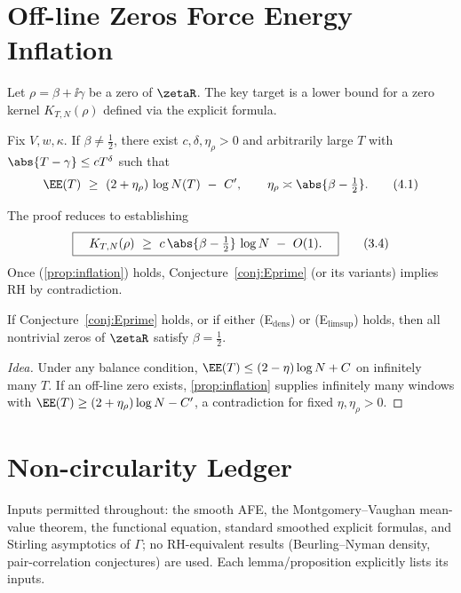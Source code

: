\section{Off-line Zeros Force Energy Inflation}
Let $\rho=\beta+\ii\gamma$ be a zero of $\zetaR$. The key target is a lower bound for a zero kernel $K_{T,N}(\rho)$ defined via the explicit formula.

\begin{proposition}\label{prop:inflation}
Fix $V,w,\kappa$. If $\beta\neq\tfrac12$, there exist $c,\delta,\eta_\rho>0$ and arbitrarily large $T$ with $\abs{T-\gamma}\le c T^\delta$ such that
\begin{equation}
\EE(T)\ \ge\ (2+\eta_\rho)\,\log N(T)\ -\ C',\qquad \eta_\rho\asymp \abs{\beta-\tfrac12}.
\tag{4.1}
\end{equation}
\end{proposition}
The proof reduces to establishing
\begin{equation}
\boxed{\quad K_{T,N}(\rho)\ \ge\ c\,\abs{\beta-\tfrac12}\,\log N\ -\ O(1).\quad}
\tag{3.4}
\end{equation}
Once (\ref{prop:inflation}) holds, Conjecture~\ref{conj:Eprime} (or its variants) implies RH by contradiction.

\begin{theorem}\label{thm:EtoRH}
If Conjecture~\ref{conj:Eprime} holds, or if either (E$_\mathrm{dens}$) or (E$_\mathrm{limsup}$) holds, then all nontrivial zeros of $\zetaR$ satisfy $\beta=\tfrac12$.
\end{theorem}
\begin{proof}[Idea]
Under any balance condition, $\EE(T)\le (2-\eta)\log N +C$ on infinitely many $T$. If an off-line zero exists, \cref{prop:inflation} supplies infinitely many windows with $\EE(T)\ge (2+\eta_\rho)\log N -C'$, a contradiction for fixed $\eta,\eta_\rho>0$.
\end{proof}

\section{Non-circularity Ledger}
Inputs permitted throughout: the smooth AFE, the Montgomery--Vaughan mean-value theorem, the functional equation, standard smoothed explicit formulas, and Stirling asymptotics of $\Gamma$; no RH-equivalent results (Beurling--Nyman density, pair-correlation conjectures) are used. Each lemma/proposition explicitly lists its inputs.


